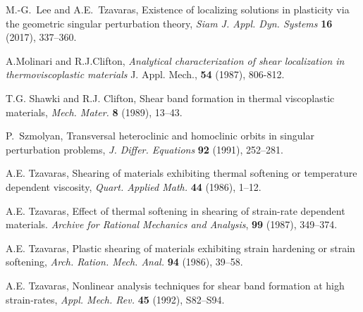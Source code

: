 \documentclass[11pt]{article}
\theoremstyle{remark}
\begin{document}
\begin{thebibliography}{10}
{\sc M.-G.~Lee and A.E.~Tzavaras},
Existence of localizing solutions in plasticity via the geometric singular perturbation theory,
{\it Siam J. Appl. Dyn. Systems} {\bf 16} (2017), 337--360.


{\sc A.Molinari and R.J.Clifton},
{\sl Analytical characterization of shear localization in thermoviscoplastic materials}
 J. Appl. Mech.,  {\bf 54} (1987), 806-812.

%
%
%

%
%

{\sc T.G. Shawki and R.J. Clifton},
Shear band formation in thermal viscoplastic materials,
{\it Mech. Mater.}
{\bf 8 } (1989), 13--43.

{\sc P.~Szmolyan},
Transversal heteroclinic and homoclinic orbits in singular perturbation problems,
{\it J. Differ. Equations}
{\bf 92} (1991), 252--281.

{\sc A.E. Tzavaras},
Shearing of materials exhibiting thermal softening or temperature dependent viscosity,
{\em Quart.  Applied Math.} {\bf 44} (1986), 1--12.

{\sc A.E. Tzavaras},
Effect of thermal softening in shearing of strain-rate dependent materials.
{\em Archive for Rational Mechanics and Analysis}, {\bf 99} (1987), 349--374.

{\sc A.E. Tzavaras},
Plastic shearing of materials exhibiting strain hardening or strain softening,
{\it Arch. Ration. Mech. Anal.}
{\bf 94} (1986), 39--58.


{\sc A.E. Tzavaras},
Nonlinear analysis techniques for shear band formation at high strain-rates,
{\it Appl. Mech. Rev.}
{\bf  45} (1992), S82--S94.




\end{thebibliography}
\end{document}
